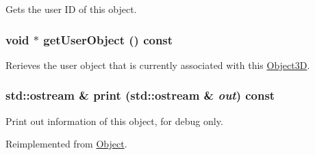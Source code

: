 Gets the user ID of this object. \hypertarget{classm3g_1_1Object3D_a9b8541216c1fa7792617218a5fb6672}{
\subsubsection[{getUserObject}]{\setlength{\rightskip}{0pt plus 5cm}void $\ast$ getUserObject () const}}
\label{classm3g_1_1Object3D_a9b8541216c1fa7792617218a5fb6672}


Rerieves the user object that is currently associated with this \hyperlink{classm3g_1_1Object3D}{Object3D}. \hypertarget{classm3g_1_1Object3D_6fea17fa1532df3794f8cb39cb4f911f}{
\subsubsection[{print}]{\setlength{\rightskip}{0pt plus 5cm}std::ostream \& print (std::ostream \& {\em out}) const}}
\label{classm3g_1_1Object3D_6fea17fa1532df3794f8cb39cb4f911f}


Print out information of this object, for debug only. 

Reimplemented from \hyperlink{classm3g_1_1Object_6fea17fa1532df3794f8cb39cb4f911f}{Object}.

